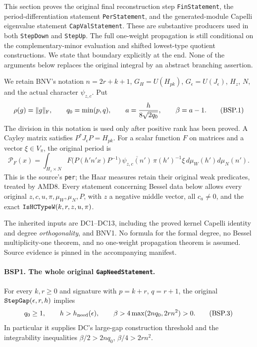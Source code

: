 \documentclass[11pt,a4paper]{article}
\numberwithin{equation}{section}
\theoremstyle{remark}\newtheorem{remark}[theorem]{Remark}
\begin{document}
This section proves the original final reconstruction step
\texttt{Fin\allowbreak Statement}, the period-differentiation statement
\texttt{Per\allowbreak Statement}, and the generated-module Capelli eigenvalue statement
\texttt{Cap\allowbreak Val\allowbreak Statement}.  These are substantive producers used in both
\texttt{Step\allowbreak Down} and \texttt{Step\allowbreak Up}.  The full one-weight propagation is
still conditional on the complementary-minor evaluation and shifted
lowest-type quotient constructions.  We state that boundary explicitly
at the end.  None of the arguments below replaces the original integral
by an abstract branching assertion.

We retain BNV's notation $n=2r+k+1$, $G_H=U(H_{pk})$,
$G_\epsilon=U(J_\epsilon)$, $H_z$, $N$, and the actual character
$\psi_{z,c}$.  Put
\[
 \rho(g)=\|g\|_{\rm F},\qquad
 q_0=\min(p,q),\qquad
 a=\frac{h}{8\sqrt{2q_0}},\qquad \beta=a-1.
 \tag{BSP.1}
\]
The division in this notation is used only after positive rank has been
proved.  A Cayley matrix satisfies $P^*J_\epsilon P=H_{pk}$.
For a scalar function $F$ on matrices and a vector $\xi\in V_\pi$, the
original period is
\[
 \mathcal P_F(x)=
 \int_{H_z\times N}
 F\bigl(P(h'n'x)P^{-1}\bigr)\,
 \overline{\psi_{z,c}(n')}\,\pi(h')^{-1}\xi\,
 d\mu_W(h')d\mu_N(n').
 \tag{BSP.2}
\]
This is the source's \texttt{per}; the Haar measures retain their original
weak predicates, treated by AMD8.  Every statement concerning Bessel data
below allows every original $z,c,u,\pi,\mu_W,\mu_N,P$, with
$z$ a negative middle vector, all $c_a\ne0$, and the exact
$\texttt{Is\allowbreak HCType\allowbreak W}(k,r,z,u,\pi)$.

The inherited inputs are DC1--DC13, including the proved kernel Capelli
identity and degree \emph{orthogonality}, and BNV1.  No formula for the
formal degree, no Bessel multiplicity-one theorem, and no one-weight
propagation theorem is assumed.  Source evidence is pinned in the
accompanying manifest.

\paragraph{BSP1. The whole original \texttt{Gap\allowbreak Need\allowbreak Statement}.}
\label{claim:BSP1}
For every $k,r\ge0$ and signature with $p=k+r$, $q=r+1$, the original
$\texttt{Step\allowbreak Gap}(\epsilon,r,h)$ implies
\[
 q_0\ge1,\qquad h>h_{\rm need}(\epsilon),\qquad
 \beta>4\max(2nq_0,2rn^2)>0.
 \tag{BSP.3}
\]
In particular it supplies DC's large-gap construction threshold and the
integrability inequalities $\beta/2>2nq_0$, $\beta/4>2rn^2$.
\end{document}
